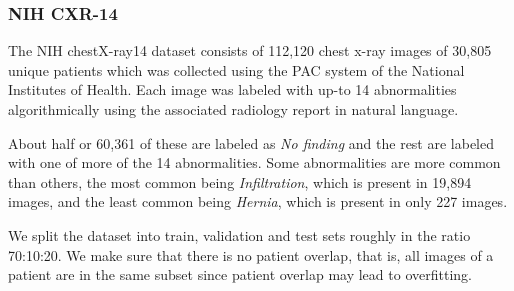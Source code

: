 \documentclass[8pt]{beamer}
\begin{document}
  \begin{frame}
    \frametitle{NIH CXR-14} The NIH chestX-ray14 dataset consists of 112,120
    chest x-ray images of 30,805 unique patients which was collected using the
    PAC system of the National Institutes of Health. Each image was labeled with
    up-to 14 abnormalities
    algorithmically using the associated radiology report in natural language. \\
    \pause

    \vspace{\baselineskip}

    About half or 60,361 of these are labeled as \emph{No finding} and the rest
    are labeled with one of more of the 14 abnormalities. Some abnormalities are
    more common than others, the most common being \emph{Infiltration}, which is
    present in 19,894 images, and the least common being \emph{Hernia}, which is
    present in only 227 images.\\ \pause

    \vspace{\baselineskip}

    We split the dataset into train, validation and test sets roughly in the
    ratio 70:10:20. We make sure that there is no patient overlap, that is, all
    images of a patient are in the same subset since patient overlap may lead to
    overfitting.


  \end{frame}
\end{document}
